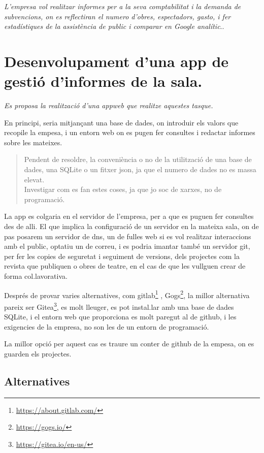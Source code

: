 \documentclass[
  10pt,
]{krantz}
\DeclareRobustCommand{\href}[2]{#2\footnote{\url{#1}}}
\begin{document}
\emph{L'empresa vol realitzar informes per a la seva comptabilitat i la demanda de subvencions, on es reflectiran el numero d'obres, espectadors, gasto, i fer estadístiques de la assistència de public i comparar en Google analític}..

\hypertarget{desenvolupament-duna-app-de-gestiuxf3-dinformes-de-la-sala.}{%
\section{Desenvolupament d'una app de gestió d'informes de la sala.}\label{desenvolupament-duna-app-de-gestiuxf3-dinformes-de-la-sala.}}

\emph{Es proposa la realització d'una appweb que realitze aquestes tasque.}

En principi, seria mitjançant una base de dades, on introduir els valors que recopile la empesa, i un entorn web on es pugen fer consultes i redactar informes sobre les mateixes.

\begin{quote}
Pendent de resoldre, la conveniència o no de la utilització de una base de dades, una SQLite o un fitxer json, ja que el numero de dades no es massa elevat.\\
Investigar com es fan estes coses, ja que jo soc de xarxes, no de programació.
\end{quote}

La app es colgaria en el servidor de l'empresa, per a que es puguen fer consultes des de alli. El que implica la configuració de un servidor en la mateixa sala, on de pas posarem un servidor de dns, un de fulles web si es vol realitzar interaccions amb el public, optatiu un de correu, i es podria imantar també un servidor git, per fer les copies de seguretat i seguiment de versions, dels projectes com la revista que publiquen o obres de teatre, en el cas de que les vullguen crear de forma col.lavorativa.

Després de provar varies alternatives, com \href{https://about.gitlab.com/}{gitlab} , \href{https://gogs.io/}{Gogs}, la millor alternativa pareix ser \href{https://gitea.io/en-us/}{Gitea}, es molt lleuger, es pot instal.lar amb una base de dades SQLite, i el entorn web que proporciona es molt paregut al de github, i les exigencies de la empresa, no son les de un entorn de programació.

La millor opció per aquest cas es traure un conter de github de la empesa, on es guarden els projectes.

\hypertarget{alternatives}{%
\subsection{Alternatives}\label{alternatives}}
\end{document}
